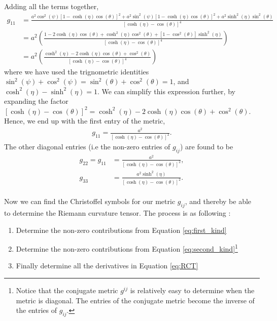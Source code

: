 \documentclass[main.tex]{subfiles}
\begin{document}
Adding all the terms together,
\begin{align*}
g_{11} &= \frac{a^2 \cos^2(\psi) [1 - \cosh(\eta)\cos(\theta)]^2 + 
		       a^2 \sin^2(\psi) [1 - \cosh(\eta)\cos(\theta)]^2 +
		       a^2\sinh^2(\eta)\sin^2(\theta)}
	     	    {[\cosh(\eta) - \cos(\theta)]^4} \\ 
	  &= a^2\left(\frac{1  -  2\cosh(\eta)\cos(\theta) + \cosh^2(\eta)\cos^2(\theta)+ 
			    [1 - \cos^2(\theta)]\sinh^2(\eta)}
		            {[\cosh(\eta) - \cos(\theta)]^4}\right)\\
	  &= a^2\left(\frac{\cosh^2(\eta) - 2\cosh(\eta)\cos(\theta) + \cos^2(\theta)}
		            {[\cosh(\eta) - \cos(\theta)]^4}\right)
\end{align*}
where we have used the trignometric identities $\sin^2 (\psi) + \cos^2 (\psi) = 
\sin^2 (\theta) + \cos^2 (\theta) = 1$, and $\cosh^2(\eta) - \sinh^2(\eta) = 1$. We can simplify
this expression further, by expanding the factor $[\cosh(\eta) - \cos(\theta)]^2 = \cosh^2(\eta)
- 2\cosh(\eta)\cos(\theta) + \cos^2(\theta)$. Hence, we end up with the first entry of the metric,
\begin{align}
\label{eq:g11}
g_{11} = \frac{a^2}{[\cosh(\eta) - \cos(\theta)]^2}.
\end{align}
The other diagonal entries (i.e the non-zero entries of $g_{ij}$) are found to be
\begin{align}
\label{eq:g22}
g_{22} = g_{11} &= \frac{a^2}{[\cosh(\eta) - \cos(\theta)]^2},
\\
\label{eq:g33}
g_{33} &= \frac{a^2\sinh^2(\eta)}{[\cosh(\eta) - \cos(\theta)]^2}.
\end{align}
\\

Now we can find the Christoffel symbols for our metric $g_{ij}$, and thereby be able to 
determine the Riemann curvature tensor. The process is as following :
\begin{enumerate}
\item Determine the non-zero contributions from Equation \eqref{eq:first_kind}
\item Determine the non-zero contributions from Equation 
\eqref{eq:second_kind}\footnote{Notice that the conjugate metric $g^{ij}$ is relatively 
easy to determine when the metric is diagonal. The entries of the conjugate metric 
become the inverse of the entries of $g_{ij}$.}
\item Finally determine all the derivatives in Equation \eqref{eq:RCT}
\end{enumerate}
\end{document}
